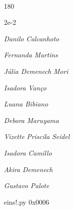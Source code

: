 \documentclass[12pt]{article}
\begin{document}

\pagebreak			

	\ 
	\vfill
	\begin{turn}{180}	
		\begin{minipage}{\textwidth}
		  	\ttfamily %
			\centering
			{\Huge 2e-2}
		  
			\hfill
		  
			

\textit{\small Danilo Calcanhoto}

\textit{\small Fernanda Martins}

\textit{\small Júlia Demenech Mori}

\textit{\small Isadora Vanço}

\textit{\small Luana Bibiano}

\textit{\small Debora Maruyama}

\textit{\small Vizette Priscila Seidel}

\textit{\small Isadora Camillo}

\textit{\small Akira Demenech}

\textit{\small Gustavo Palote}

\bigskip

eins!.py
0x0006


		\end{minipage}	
	\end{turn}
	\vfill
	\

\pagebreak
\end{document}
